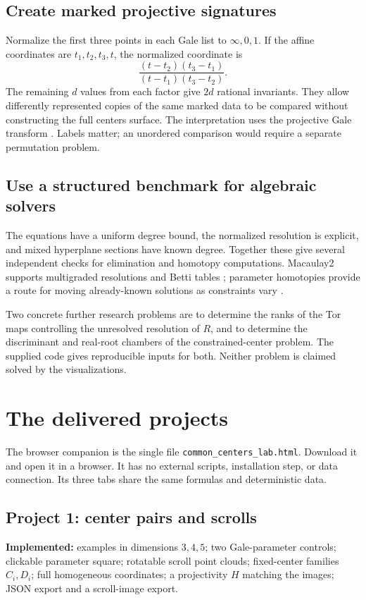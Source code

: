 \documentclass[11pt]{article}
\begin{document}
\subsection{Create marked projective signatures}
Normalize the first three points in each Gale list to $\infty,0,1$. If the affine coordinates are $t_1,t_2,t_3,t$, the normalized coordinate is
\[
\frac{(t-t_2)(t_3-t_1)}{(t-t_1)(t_3-t_2)}.
\]
The remaining $d$ values from each factor give $2d$ rational invariants. They allow differently represented copies of the same marked data to be compared without constructing the full centers surface. The interpretation uses the projective Gale transform \cite{EP}. Labels matter; an unordered comparison would require a separate permutation problem.

\subsection{Use a structured benchmark for algebraic solvers}
The equations have a uniform degree bound, the normalized resolution is explicit, and mixed hyperplane sections have known degree. Together these give several independent checks for elimination and homotopy computations. Macaulay2 supports multigraded resolutions and Betti tables \cite{M2}; parameter homotopies provide a route for moving already-known solutions as constraints vary \cite{HC}.

Two concrete further research problems are to determine the ranks of the Tor maps controlling the unresolved resolution of $R$, and to determine the discriminant and real-root chambers of the constrained-center problem. The supplied code gives reproducible inputs for both. Neither problem is claimed solved by the visualizations.

\section{The delivered projects}
The browser companion is the single file \texttt{common\_centers\_lab.html}. Download it and open it in a browser. It has no external scripts, installation step, or data connection. Its three tabs share the same formulas and deterministic data.

\subsection{Project 1: center pairs and scrolls}
\textbf{Implemented:} examples in dimensions $3,4,5$; two Gale-parameter controls; clickable parameter square; rotatable scroll point clouds; fixed-center families $C_i,D_i$; full homogeneous coordinates; a projectivity $H$ matching the images; JSON export and a scroll-image export.
\end{document}
